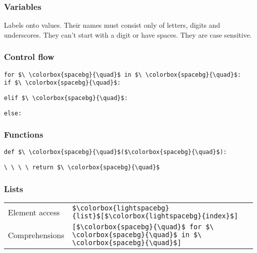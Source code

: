 \documentclass[12pt,twocolumn]{article}
\begin{document}
	\subsubsection*{Variables}
	
	Labels onto values. Their names must consist only of letters, digits and underscores. They can't start with a digit or have spaces. They are case sensitive.
	
	\subsubsection*{Control flow}
	
	\colorbox{codebg}{\lstinline|for $\ \colorbox{spacebg}{\quad}$ in $\ \colorbox{spacebg}{\quad}$:|} \\
	
	\colorbox{codebg}{\lstinline|if $\ \colorbox{spacebg}{\quad}$:|}
	\vspace{1mm}
	
	\colorbox{codebg}{\lstinline|elif $\ \colorbox{spacebg}{\quad}$:|}
	\vspace{1mm}
	
	\colorbox{codebg}{\lstinline|else:|}
	
	\subsubsection*{Functions}
	
	\colorbox{codebg}{\lstinline|def $\ \colorbox{spacebg}{\quad}$($\colorbox{spacebg}{\quad}$):|}
	
	\vspace{1mm}
	
	\colorbox{codebg}{\lstinline|\ \ \ \ return $\ \colorbox{spacebg}{\quad}$|} \\
	
	\newpage
	\vspace*{-1.5cm}
	\subsubsection*{Lists}
	
	\begin{tabular}{l l}
		Element access &
		\colorbox{codebg}{\lstinline|$\colorbox{lightspacebg}{list}$[$\colorbox{lightspacebg}{index}$]|} \vspace{1mm} \\
		
		Comprehensions &
		\colorbox{codebg}{\lstinline|[$\colorbox{spacebg}{\quad}$ for $\ \colorbox{spacebg}{\quad}$ in $\ \colorbox{spacebg}{\quad}$]|}
	\end{tabular}
	
\end{document}
